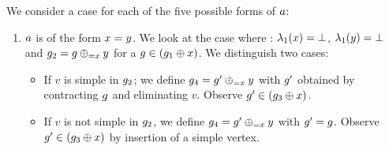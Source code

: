 \begin{enumerate}
  We consider a case for each of the five possible 
  forms of $a$:
%
%
\begin{enumerate}
\item $a$ is of the form $x=y$.
%
We look at the case where :
    $\lambda_1(x)=\bot$, %
    $\lambda_1(y)=\bot$ and
    $g_2=g\oplus_{={x}}{y}$ for a
    $g\in\left(g_1\oplus{\ensuremath{x}}\right)$.
We distinguish two cases:
\begin{itemize}
\item If $v$ is simple in $g_2$; 
  we define $g_4=g'\oplus_{={x}}{y}$ with $g'$
  obtained by contracting $g$ and eliminating $v$.
  Observe $g'\in\left(g_3\oplus{\ensuremath{x}}\right)$.
\item If $v$ is not simple in $g_2$, 
  we define $g_4=g'\oplus_{={x}}{y}$ with $g'=g$.
  Observe $g'\in\left(g_3\oplus{\ensuremath{x}}\right)$ 
  by insertion of a simple vertex.
\end{itemize}


\end{enumerate}
\end{enumerate}
